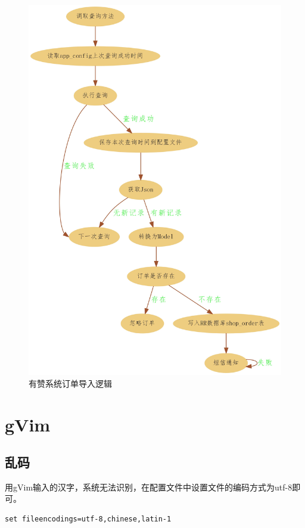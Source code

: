 \documentclass{book}
\begin{document}
\begin{figure}[htbp]
	\centering
	\includegraphics[scale=0.15]{YZLogic.jpg}
	\caption{有赞系统订单导入逻辑}
	\label{YZLogic}
\end{figure}

\section{gVim}

\subsection{乱码}

用gVim输入的汉字，系统无法识别，在配置文件中设置文件的编码方式为utf-8即可。

\begin{lstlisting}
set fileencodings=utf-8,chinese,latin-1
\end{lstlisting}
\end{document}
